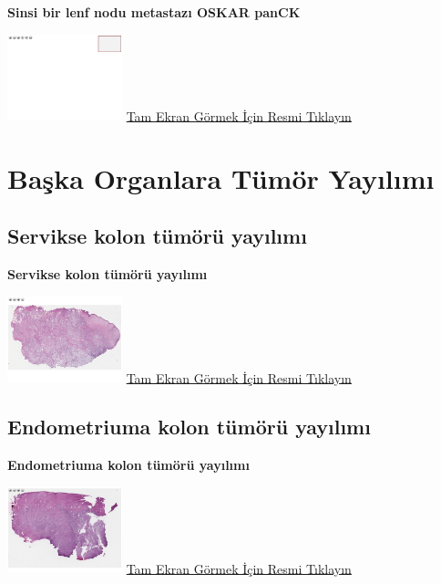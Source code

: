 \documentclass[
  letterpaper,
  DIV=11,
  numbers=noendperiod]{scrreprt}
\begin{document}
\textbf{Sinsi bir lenf nodu metastazı OSKAR panCK}

\href{https://images.patolojiatlasi.com/template/HE.html}{\includegraphics[width=0.25\textwidth,height=\textheight]{./screenshots/template_screenshot.png}}
\href{https://images.patolojiatlasi.com/insidious-lymph-node-metastasis/OSKARCK.html}{Tam
Ekran Görmek İçin Resmi Tıklayın}

\hypertarget{sec-baska-organlara-tumor-yayilimi}{%
\chapter{Başka Organlara Tümör
Yayılımı}\label{sec-baska-organlara-tumor-yayilimi}}

\hypertarget{sec-servikse-kolon-tumor-yayilimi}{%
\section{Servikse kolon tümörü
yayılımı}\label{sec-servikse-kolon-tumor-yayilimi}}

\textbf{Servikse kolon tümörü yayılımı}

\href{https://images.patolojiatlasi.com/tumor-spread/HE-cervix.html}{\includegraphics[width=0.25\textwidth,height=\textheight]{./screenshots/tumor-spread-cervix_screenshot.png}}
\href{https://images.patolojiatlasi.com/tumor-spread/HE-cervix.html}{Tam
Ekran Görmek İçin Resmi Tıklayın}

\hypertarget{sec-endometriuma-kolon-tumor-yayilimi}{%
\section{Endometriuma kolon tümörü
yayılımı}\label{sec-endometriuma-kolon-tumor-yayilimi}}

\textbf{Endometriuma kolon tümörü yayılımı}

\href{https://images.patolojiatlasi.com/tumor-spread/HE-endometrium.html}{\includegraphics[width=0.25\textwidth,height=\textheight]{./screenshots/tumor-spread-endometrium_screenshot.png}}
\href{https://images.patolojiatlasi.com/tumor-spread/HE-endometrium.html}{Tam
Ekran Görmek İçin Resmi Tıklayın}
\end{document}
